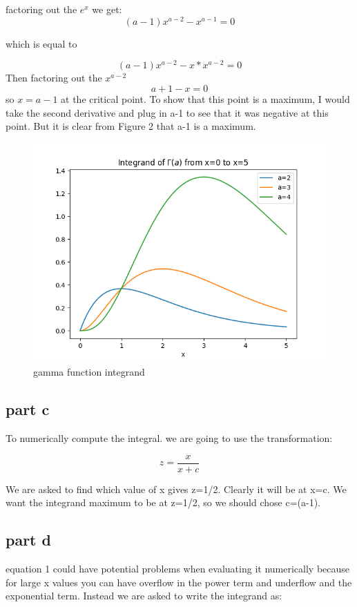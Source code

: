 \documentclass{article}
\begin{document}
factoring out the $e^{x}$ we get:
\begin{equation}
    (a-1)x^{a-2}-x^{a-1}=0
\end{equation}

which is equal to

\begin{equation}
    (a-1)x^{a-2}-x*x^{a-2}=0
    \end{equation}
Then factoring out the $x^{a-2}$
\begin{equation}
        a+1-x=0
\end{equation}
so $x=a-1$ at the critical point. To show that this point is a maximum, I would take the second derivative and plug in a-1 to see that it was negative at this point. But it is clear from Figure 2 that a-1 is a maximum.
\begin{figure}[t]
    \centering
    \includegraphics[width=0.5\linewidth]{ps5_figs/gamma_integrand.png}
    \caption{gamma function integrand}
    \label{fig:enter-label}
\end{figure}

\subsection{part c}
To numerically compute the integral. we are going to use the transformation:

\begin{equation}
    z=\frac{x}{x+c}
\end{equation}

We are asked to find which value of x gives z=1/2. Clearly it will be at x=c. We want the integrand maximum to be at z=1/2, so we should chose c=(a-1). 
\subsection{part d}
equation 1 could have potential problems when evaluating it numerically because for large x values you can have overflow in the power term and underflow and the exponential term. Instead we are asked to write the integrand as:
\end{document}
